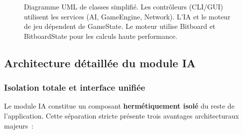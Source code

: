 \documentclass[a4paper]{article}
\begin{document}
\begin{figure}[H]
\caption{Diagramme UML de classes simplifié. Les contrôleurs (CLI/GUI) utilisent les services (AI, GameEngine, Network). L'IA et le moteur de jeu dépendent de GameState. Le moteur utilise Bitboard et BitboardState pour les calculs haute performance.}
\label{fig:uml-simple}
\end{figure}

\paragraph{}


\subsection{Architecture détaillée du module IA}
\label{sec:ia-arch-detail}

\subsubsection{Isolation totale et interface unifiée}

Le module IA constitue un composant \textbf{hermétiquement isolé} du reste de l'application. Cette séparation stricte présente trois avantages architecturaux majeurs~:
\end{document}
